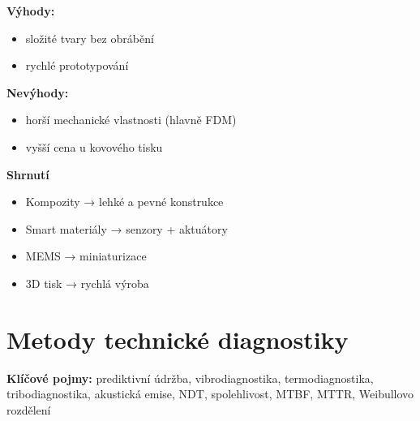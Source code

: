 \documentclass[a4paper,10pt]{article}
\begin{document}
\begin{vysvetlenibox}
\textbf{Výhody:}
\begin{itemize}
\item složité tvary bez obrábění
\item rychlé prototypování
\end{itemize}

\textbf{Nevýhody:}
\begin{itemize}
\item horší mechanické vlastnosti (hlavně FDM)
\item vyšší cena u kovového tisku
\end{itemize}

\textbf{Shrnutí}

\begin{itemize}
\item Kompozity → lehké a pevné konstrukce
\item Smart materiály → senzory + aktuátory
\item MEMS → miniaturizace
\item 3D tisk → rychlá výroba
\end{itemize}

\end{vysvetlenibox}



\newpage


\section{Metody technické diagnostiky}

\begin{pojmybox}
\textbf{Klíčové pojmy:}
prediktivní údržba, vibrodiagnostika, termodiagnostika,
tribodiagnostika, akustická emise, NDT,
spolehlivost, MTBF, MTTR, Weibullovo rozdělení
\end{pojmybox}
\end{document}
